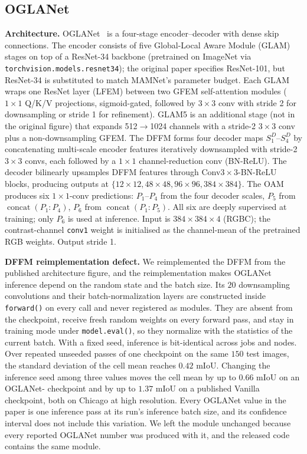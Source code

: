 \subsection{OGLANet}
\label{sec:oglanet-base}

\textbf{Architecture.}
OGLANet~\cite{oglanet} is a four-stage encoder--decoder with
dense skip connections.  The encoder consists of five Global-Local
Aware Module (GLAM) stages on top of a ResNet-34 backbone (pretrained
on ImageNet via \texttt{torchvision.models.resnet34}); the original
paper specifies ResNet-101, but ResNet-34 is substituted to match
MAMNet's parameter budget.  Each GLAM wraps one ResNet layer (LFEM)
between two GFEM self-attention modules ($1{\times}1$ Q/K/V
projections, sigmoid-gated, followed by $3{\times}3$ conv with
stride 2 for downsampling or stride 1 for refinement).  GLAM5 is an
additional stage (not in the original figure) that expands 512$\to$1024
channels with a stride-2 $3{\times}3$ conv plus a non-downsampling
GFEM.  The DFFM forms four decoder maps $S^D_1$--$S^D_4$ by
concatenating multi-scale encoder features iteratively downsampled
with stride-2 $3{\times}3$ convs, each followed by a $1{\times}1$
channel-reduction conv (BN-ReLU).  The decoder bilinearly upsamples
DFFM features through Conv$3{\times}3$-BN-ReLU blocks, producing
outputs at $\{12{\times}12, 48{\times}48, 96{\times}96,
384{\times}384\}$.  The OAM produces six $1{\times}1$-conv predictions:
$P_1$--$P_4$ from the four decoder scales, $P_5$ from
$\operatorname{concat}(P_1{:}P_4)$, $P_6$ from
$\operatorname{concat}(P_1{:}P_5)$.  All six are deeply supervised at
training; only $P_6$ is used at inference.  Input is $384{\times}384
{\times}4$ (RGBC); the contrast-channel \texttt{conv1} weight is
initialised as the channel-mean of the pretrained RGB weights.
Output stride 1.  

\textbf{DFFM reimplementation defect.}\label{app:oglanet-dffm}
We reimplemented the DFFM from the published architecture figure, and the
reimplementation makes OGLANet inference depend on the random state and the
batch size.  Its $20$ downsampling convolutions and their batch-normalization
layers are constructed inside \texttt{forward()} on every call and never
registered as modules.  They are absent from the checkpoint, receive fresh
random weights on every forward pass, and stay in training mode under
\texttt{model.eval()}, so they normalize with the statistics of the current
batch.  With a fixed seed, inference is bit-identical across jobs and nodes.
Over repeated unseeded passes of one checkpoint on the same $150$ test images,
the standard deviation of the cell mean reaches $0.42$ mIoU.  Changing the
inference seed among three values moves the cell mean by up to $0.66$ mIoU on
an OGLANet-\sib{} checkpoint and by up to $1.37$ mIoU on a published Vanilla
checkpoint, both on Chicago at high resolution.  Every OGLANet value in the
paper is one inference pass at its run's inference batch size, and its
confidence interval does not include this variation.  We left the module
unchanged because every reported OGLANet number was produced with it, and the
released code contains the same module.

